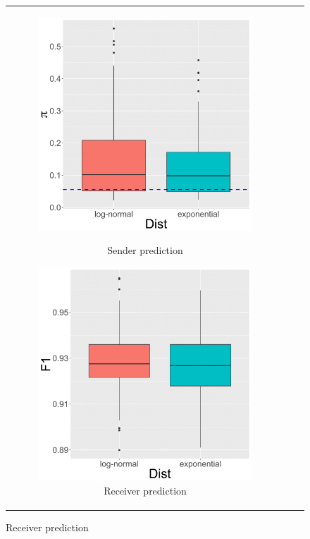 \documentclass[ba]{imsart}
\numberwithin{equation}{section}
\theoremstyle{plain}
\begin{document}
	\begin{figure}[!t]
		\centering
		\begin{tabular}[t]{ccc}
			\begin{subfigure}[b]{0.33\textwidth}
				\caption{Sender prediction}
				\includegraphics[width=\textwidth]{img/senderpredict-1.png}	
				\label{subfigure:PPEresults1}
			\end{subfigure}
			\begin{subfigure}[b]{0.33\textwidth}
				\caption{Receiver prediction}
				\includegraphics[width=\textwidth]{img/receiverpredict-1.png}	

\end{subfigure}
\end{tabular}
\end{figure}
\end{document}
